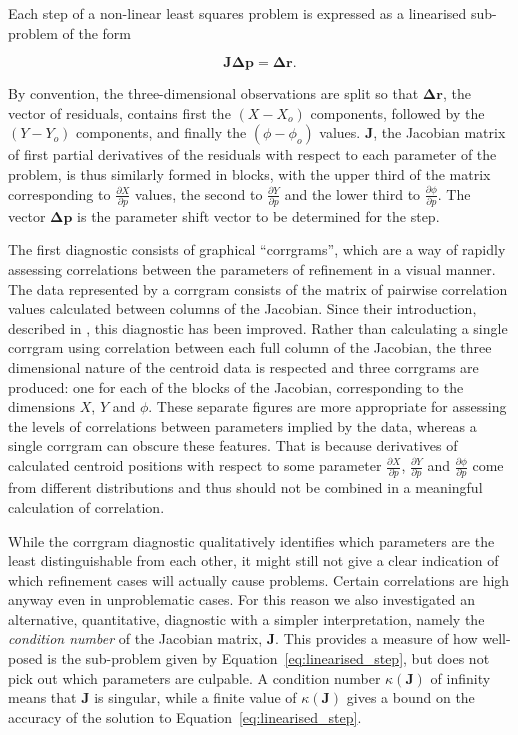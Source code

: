 \documentclass[preprint]{iucr}
\renewcommand{\vec}[1]{\mathbf{#1}}
\newcommand{\mat}[1]{\mathbf{#1}}
\newcommand{\pder}[2][]{\frac{\partial#1}{\partial#2}}
\begin{document}
Each step of a non-linear least squares problem is expressed as a linearised
sub-problem of the form

\begin{equation}
  \label{eq:linearised_step}
  \mat{J} \vec{\Delta p} = \vec{\Delta r}.
\end{equation}

By convention, the three-dimensional observations are split so that
$\vec{\Delta r}$, the vector of residuals, contains first the $(X - X_o)$
components, followed by the $(Y - Y_o)$ components, and finally the $(\phi -
\phi_o)$ values. $\mat{J}$, the Jacobian matrix of first partial derivatives of
the residuals with respect to each parameter of the problem, is thus similarly
formed in blocks, with the upper third of the matrix corresponding to
$\pder[X]{p}$ values, the second to $\pder[Y]{p}$ and the lower third to
$\pder[\phi]{p}$. The vector $\vec{\Delta p}$ is the parameter shift vector to
be determined for the step.

The first diagnostic consists of graphical ``corrgrams'', which are a way of
rapidly assessing correlations between the parameters of refinement in a visual
manner. The data represented by a corrgram consists of the matrix of pairwise
correlation values calculated between columns of the Jacobian. Since their
introduction, described in , this diagnostic has been
improved. Rather than calculating a single corrgram using correlation between
each full column of the Jacobian, the three dimensional nature of the centroid
data is respected and three corrgrams are produced: one for each of the blocks
of the Jacobian, corresponding to the dimensions $X$, $Y$ and $\phi$. These
separate figures are more appropriate for assessing the levels of correlations
between parameters implied by the data, whereas a single corrgram can obscure
these features. That is because derivatives of calculated centroid positions
with respect to some parameter $\pder[X]{p}$, $\pder[Y]{p}$ and
$\pder[\phi]{p}$ come from different distributions and thus should not be
combined in a meaningful calculation of correlation.

While the corrgram diagnostic qualitatively identifies which parameters are the
least distinguishable from each other, it might still not give a clear
indication of which refinement cases will actually cause problems. Certain
correlations are high anyway even in unproblematic cases. For this reason we
also investigated an alternative, quantitative, diagnostic with a simpler
interpretation, namely the \emph{condition number} of the Jacobian matrix,
$\mat{J}$. This provides a measure of how well-posed is the sub-problem given
by Equation~\ref{eq:linearised_step}, but does not pick out which parameters
are culpable. A condition number $\kappa \left( \mat{J} \right)$ of infinity
means that $\mat{J}$ is singular, while a finite value of $\kappa \left(
\mat{J} \right)$ gives a bound on the accuracy of the solution to
Equation~\ref{eq:linearised_step}.
\end{document}
